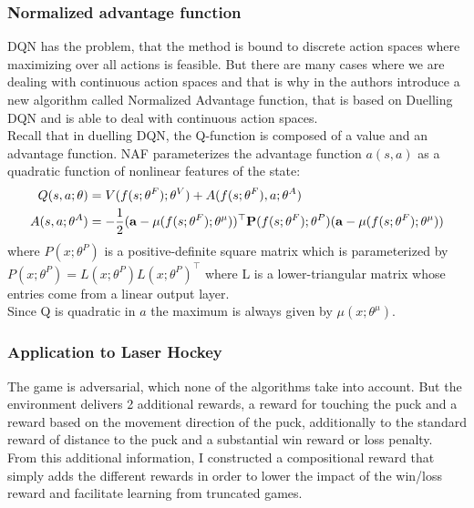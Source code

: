 \subsubsection{Normalized advantage function}
DQN has the problem, that the method is bound to discrete action spaces where maximizing over all actions is feasible.
But there are many cases where we are dealing with continuous action spaces and that is why in \cite{NAF} the authors introduce a new algorithm called Normalized Advantage function, that is based on Duelling DQN and is able to deal with continuous action spaces.\\
Recall that in duelling DQN, the Q-function is composed of a value and an advantage function. NAF parameterizes the advantage function $a(s,a)$ as a quadratic function of nonlinear features of the state:
\begin{align*}
    Q(s,a;\theta) &= V(f(s;\theta^F);\theta^V) + A(f(s;\theta^F), a;\theta^A)\\
    A(s,a;\theta^A) &= -\frac{1}{2}(\mathbf a-\mathbf \mu(f(s;\theta^F);\theta^{\mu}))^\top \mathbf P(f(s;\theta^F);\theta^P)(\mathbf a-\mathbf \mu(f(s;\theta^F);\theta^\mu))
\end{align*}
where $P(x;\theta^P)$ is a positive-definite square matrix which is parameterized by $P(x;\theta^P) = L(x;\theta^P)L(x;\theta^P)^\top$ where L is a lower-triangular matrix whose entries come from a linear output layer.\\
Since Q is quadratic in $a$ the maximum is always given by $\mu(x;\theta^\mu)$.\\

\subsubsection{Application to Laser Hockey}
The game is adversarial, which none of the algorithms take into account. 
But the environment delivers 2 additional rewards, a reward for touching the puck and a reward based on the movement direction of the puck, additionally to the standard reward of distance to the puck and a substantial win reward or loss penalty.\\
From this additional information, I constructed a compositional reward that simply adds the different rewards in order to lower the impact of the win/loss reward and facilitate learning from truncated games.\\

